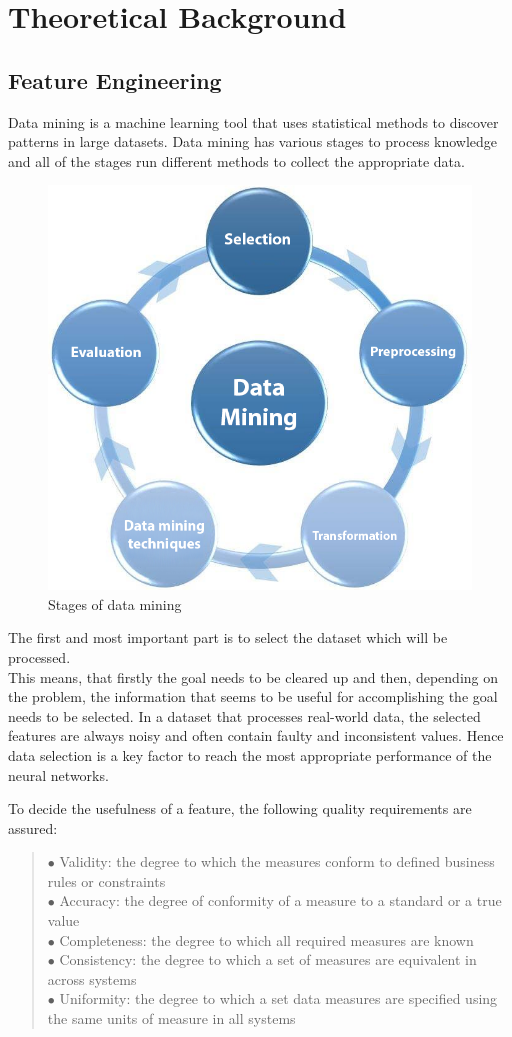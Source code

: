 \chapter{Theoretical Background}

\section{Feature Engineering}

Data mining is a machine learning tool that uses statistical methods to discover patterns in large datasets. Data mining has various stages to process knowledge and all of the stages run different methods to collect the appropriate data.

\begin{figure}[h]
	\centering
	\includegraphics[height=0.55\linewidth]{./figures/data_mining_stages}
	\caption{Stages of data mining}
	\label{fig:stages}
\end{figure}

The first and most important part is to select the dataset which will be processed. \\
This means, that firstly the goal needs to be cleared up and then, depending on the problem, the information that seems to be useful for accomplishing the goal needs to be selected. In a dataset that processes real-world data, the selected features are always noisy and often contain faulty and inconsistent values. Hence data selection is a key factor to reach the most appropriate performance of the neural networks. 

\newpage
\noindent To decide the usefulness of a feature, the following quality requirements are assured: 
\begin{verse}
	$\bullet$ Validity: the degree to which the measures conform to defined business rules or constraints\\
	$\bullet$ Accuracy: the degree of conformity of a measure to a standard or a true value\\
	$\bullet$ Completeness: the degree to which all required measures are known\\
	$\bullet$ Consistency: the degree to which a set of measures are equivalent in across systems\\
	$\bullet$ Uniformity: the degree to which a set data measures are specified using the same units of measure in all systems
\end{verse}

